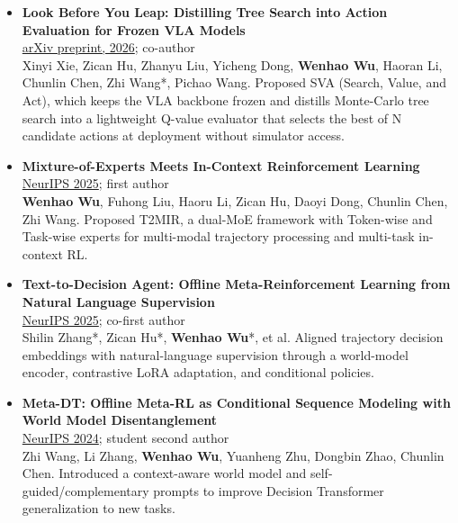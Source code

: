 \documentclass[a4paper,11pt]{article}
\newcommand{\paper}[3]{\item \textbf{#1}\\{\small #2}\\{\small #3}\vspace{3pt}}
\begin{document}
\begin{itemize}[leftmargin=1.4em,label=\textbullet,itemsep=6pt,topsep=2pt]
\paper{Look Before You Leap: Distilling Tree Search into Action Evaluation for Frozen VLA Models}{\href{https://arxiv.org/abs/2607.03751}{arXiv preprint, 2026}; co-author}{Xinyi Xie, Zican Hu, Zhanyu Liu, Yicheng Dong, \textbf{Wenhao Wu}, Haoran Li, Chunlin Chen, Zhi Wang*, Pichao Wang.}
Proposed SVA (Search, Value, and Act), which keeps the VLA backbone frozen and distills Monte-Carlo tree search into a lightweight Q-value evaluator that selects the best of N candidate actions at deployment without simulator access.\par

\paper{Mixture-of-Experts Meets In-Context Reinforcement Learning}{\href{https://proceedings.neurips.cc/paper_files/paper/2025/hash/233cbc888ef01917d8d895e471e80a01-Abstract-Conference.html}{NeurIPS 2025}; first author}{\textbf{Wenhao Wu}, Fuhong Liu, Haoru Li, Zican Hu, Daoyi Dong, Chunlin Chen, Zhi Wang.}
Proposed T2MIR, a dual-MoE framework with Token-wise and Task-wise experts for multi-modal trajectory processing and multi-task in-context RL.\par

\paper{Text-to-Decision Agent: Offline Meta-Reinforcement Learning from Natural Language Supervision}{\href{https://proceedings.neurips.cc/paper_files/paper/2025/hash/719ae4f0533c93b6213a3ec120e14554-Abstract-Conference.html}{NeurIPS 2025}; co-first author}{Shilin Zhang*, Zican Hu*, \textbf{Wenhao Wu}*, et al.}
Aligned trajectory decision embeddings with natural-language supervision through a world-model encoder, contrastive LoRA adaptation, and conditional policies.\par

\paper{Meta-DT: Offline Meta-RL as Conditional Sequence Modeling with World Model Disentanglement}{\href{https://proceedings.neurips.cc/paper_files/paper/2024/hash/4f3820576130a8f796ddbf204c841487-Abstract-Conference.html}{NeurIPS 2024}; student second author}{Zhi Wang, Li Zhang, \textbf{Wenhao Wu}, Yuanheng Zhu, Dongbin Zhao, Chunlin Chen.}
Introduced a context-aware world model and self-guided/complementary prompts to improve Decision Transformer generalization to new tasks.
\end{itemize}
\end{document}
